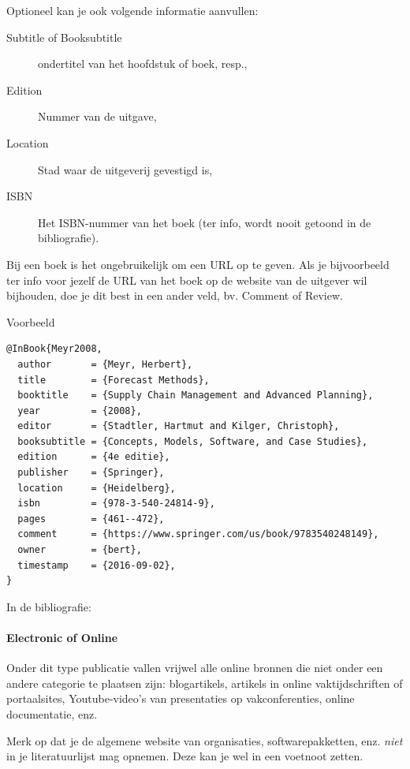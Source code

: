 Optioneel kan je ook volgende informatie aanvullen:

\begin{description}
  \item[Subtitle of Booksubtitle] ondertitel van het hoofdstuk of boek, resp.,
  \item[Edition] Nummer van de uitgave,
  \item[Location] Stad waar de uitgeverij gevestigd is,
  \item[ISBN] Het ISBN-nummer van het boek (ter info, wordt nooit getoond in de bibliografie).
\end{description}

Bij een boek is het ongebruikelijk om een URL op te geven. Als je bijvoorbeeld ter info voor jezelf de URL van het boek op de website van de uitgever wil bijhouden, doe je dit best in een ander veld, bv. Comment of Review.

Voorbeeld
\begin{verbatim}
@InBook{Meyr2008,
  author       = {Meyr, Herbert},
  title        = {Forecast Methods},
  booktitle    = {Supply Chain Management and Advanced Planning},
  year         = {2008},
  editor       = {Stadtler, Hartmut and Kilger, Christoph},
  booksubtitle = {Concepts, Models, Software, and Case Studies},
  edition      = {4e editie},
  publisher    = {Springer},
  location     = {Heidelberg},
  isbn         = {978-3-540-24814-9},
  pages        = {461--472},
  comment      = {https://www.springer.com/us/book/9783540248149},
  owner        = {bert},
  timestamp    = {2016-09-02},
}
\end{verbatim}


In de bibliografie: 


\paragraph{Electronic of Online}

Onder dit type publicatie vallen vrijwel alle online bronnen die niet onder een andere categorie te plaatsen zijn: blogartikels, artikels in online vaktijdschriften of portaalsites, Youtube-video's van presentaties op vakconferenties, online documentatie, enz.

Merk op dat je de algemene website van organisaties, softwarepakketten, enz. \emph{niet} in je literatuurlijst mag opnemen. Deze kan je wel in een voetnoot zetten.

